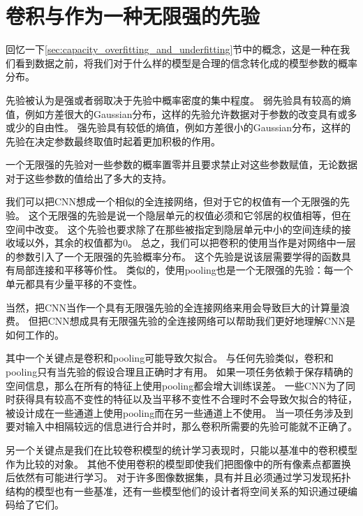 \section{卷积与作为一种无限强的先验}
\label{sec:convolution_and_pooling_as_an_infinitely_strong_prior}

回忆一下\ref{sec:capacity_overfitting_and_underfitting}节中的概念，这是一种在我们看到数据之前，将我们对于什么样的模型是合理的信念转化成的模型参数的概率分布。

 
先验被认为是强或者弱取决于先验中概率密度的集中程度。
弱先验具有较高的熵值，例如方差很大的Gaussian分布，这样的先验允许数据对于参数的改变具有或多或少的自由性。
强先验具有较低的熵值，例如方差很小的Gaussian分布，这样的先验在决定参数最终取值时起着更加积极的作用。

一个无限强的先验对一些参数的概率置零并且要求禁止对这些参数赋值，无论数据对于这些参数的值给出了多大的支持。

我们可以把\gls{CNN}想成一个相似的全连接网络，但对于它的权值有一个无限强的先验。
这个无限强的先验是说一个隐层单元的权值必须和它邻居的权值相等，但在空间中改变。
这个先验也要求除了在那些被指定到隐层单元中小的空间连续的接收域以外，其余的权值都为0。
总之，我们可以把卷积的使用当作是对网络中一层的参数引入了一个无限强的先验概率分布。
这个先验是说该层需要学得的函数具有局部连接和平移等价性。
类似的，使用\gls{pooling}也是一个无限强的先验：每一个单元都具有少量平移的不变性。

当然，把\gls{CNN}当作一个具有无限强先验的全连接网络来用会导致巨大的计算量浪费。
但把\gls{CNN}想成具有无限强先验的全连接网络可以帮助我们更好地理解\gls{CNN}是如何工作的。

其中一个关键点是卷积和\gls{pooling}可能导致欠拟合。
与任何先验类似，卷积和\gls{pooling}只有当先验的假设合理且正确时才有用。
如果一项任务依赖于保存精确的空间信息，那么在所有的特征上使用\gls{pooling}都会增大训练误差。
一些\gls{CNN}\citep{Szegedy-et-al-arxiv2014}为了同时获得具有较高不变性的特征以及当平移不变性不合理时不会导致欠拟合的特征，被设计成在一些通道上使用\gls{pooling}而在另一些通道上不使用。
当一项任务涉及到要对输入中相隔较远的信息进行合并时，那么卷积所需要的先验可能就不正确了。

另一个关键点是我们在比较卷积模型的统计学习表现时，只能以基准中的卷积模型作为比较的对象。
其他不使用卷积的模型即使我们把图像中的所有像素点都置换后依然有可能进行学习。
对于许多图像数据集，具有并且必须通过学习发现拓扑结构的模型也有一些基准，还有一些模型他们的设计者将空间关系的知识通过硬编码给了它们。

